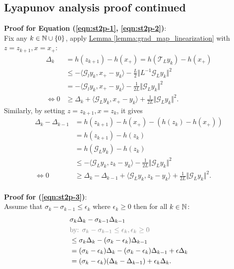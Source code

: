 \documentclass[12pt]{article}
\begin{document}
    \subsection{Lyapunov analysis proof continued}\label{sec:st2p_proof_continued}
        \textbf{Proof for Equation (\ref*{eqn:st2p-1}, \ref*{eqn:st2p-2})}:
        \\
        Fix any $k \in \mathbb N\cup \{0\}$, apply
        \hyperref[lemma:grad_map_linearization]
        {Lemma \ref*{lemma:grad_map_linearization}}
        with $z = z_{k + 1}, x = x_+$: 
        \begin{align*}
            \Delta_k &= h(z_{k + 1}) - h(x_+) = h(\mathcal T_L y_k) - h(x_+) 
            \\
            &\le 
            - \langle \mathcal G_l y_k, x_+ - y_k \rangle 
            - \frac{L}{2}\Vert L^{-1} \mathcal G_Ly_k\Vert^2
            \\
            &= 
            - \langle \mathcal G_l y_k, x_+ - y_k \rangle 
            - \frac{1}{2L}\Vert \mathcal G_L y_k\Vert^2
            \\
            \iff 
            0& \ge \Delta_k + \langle \mathcal G_L y_k, x_+ - y_k\rangle + \frac{1}{2L}\Vert \mathcal G_L y_k\Vert^2. 
        \end{align*}
        Similarly, by setting $z = z_{k + 1}, x = z_k$, it gives 
        \begin{align*}
            \Delta_k - \Delta_{k - 1} &= 
            h(z_{k + 1}) - h(x_+) - (h(z_k) - h(x_+)) 
            \\
            &= h(z_{k + 1}) - h(z_k)
            \\
            &= h( \mathcal G_L y_k) - h(z_k)
            \\
            &\le 
            - \langle \mathcal G_L y_k, z_k - y_k\rangle - 
            \frac{1}{2L} \Vert \mathcal G_L y_k \Vert^2
            \\
            \iff 
            0 &\ge
            \Delta_k - \Delta_{k - 1}
            + \langle \mathcal G_L y_k, z_k - y_k\rangle
            + \frac{1}{2L} \Vert \mathcal G_L y_k \Vert^2.
        \end{align*}
        \\
        \textbf{Proof for (\ref*{eqn:st2p-3})}: 
        \\
        Assume that $\sigma_k - \sigma_{k -1} \le \epsilon_k$ where $\epsilon_k \ge 0$ then for all $k \in \mathbb N$: 
        \begin{align*}
            &
            \sigma_k \Delta_k - \sigma_{k - 1} \Delta_{k - 1}
            \\
            & 
            \textcolor{gray}{
                \text{by: } \sigma_k - \sigma_{k - 1} \le \epsilon_k, \epsilon_k \ge 0
            }
            \\
            &\le 
            \sigma_k \Delta_k - (\sigma_k - \epsilon_k)\Delta_{k - 1}
            \\
            &= 
            (\sigma_k - \epsilon_k)\Delta_k - (\sigma_k - \epsilon_k)\Delta_{k - 1}
            + \epsilon \Delta_k 
            \\
            &= (\sigma_k - \epsilon_k)(\Delta_k - \Delta_{k - 1}) + \epsilon_k \Delta_k. 
        \end{align*}
\end{document}
